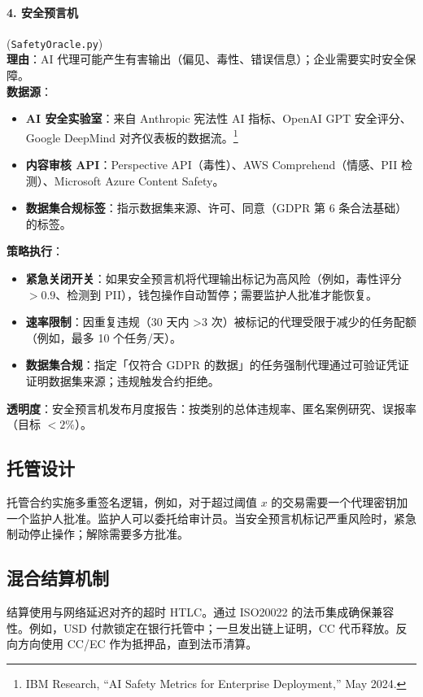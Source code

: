 \documentclass[11pt]{article}
\begin{document}
\paragraph{4. 安全预言机} (\texttt{SafetyOracle.py})\\
\textbf{理由}：AI 代理可能产生有害输出（偏见、毒性、错误信息）；企业需要实时安全保障。\\
\textbf{数据源}：
\begin{itemize}[noitemsep]
  \item \textbf{AI 安全实验室}：来自 Anthropic 宪法性 AI 指标、OpenAI GPT 安全评分、Google DeepMind 对齐仪表板的数据流。\footnote{IBM Research, ``AI Safety Metrics for Enterprise Deployment,'' May 2024.}
  \item \textbf{内容审核 API}：Perspective API（毒性）、AWS Comprehend（情感、PII 检测）、Microsoft Azure Content Safety。
  \item \textbf{数据集合规标签}：指示数据集来源、许可、同意（GDPR 第 6 条合法基础）的标签。
\end{itemize}
\textbf{策略执行}：
\begin{itemize}[noitemsep]
  \item \textbf{紧急关闭开关}：如果安全预言机将代理输出标记为高风险（例如，毒性评分 $>0.9$、检测到 PII），钱包操作自动暂停；需要监护人批准才能恢复。
  \item \textbf{速率限制}：因重复违规（30 天内 >3 次）被标记的代理受限于减少的任务配额（例如，最多 10 个任务/天）。
  \item \textbf{数据集合规}：指定「仅符合 GDPR 的数据」的任务强制代理通过可验证凭证证明数据集来源；违规触发合约拒绝。
\end{itemize}
\textbf{透明度}：安全预言机发布月度报告：按类别的总体违规率、匿名案例研究、误报率（目标 $<2\%$）。

\subsection{托管设计}
托管合约实施多重签名逻辑，例如，对于超过阈值 $x$ 的交易需要一个代理密钥加一个监护人批准。监护人可以委托给审计员。当安全预言机标记严重风险时，紧急制动停止操作；解除需要多方批准。

\subsection{混合结算机制}
结算使用与网络延迟对齐的超时 HTLC。通过 ISO20022 的法币集成确保兼容性。例如，USD 付款锁定在银行托管中；一旦发出链上证明，CC 代币释放。反向方向使用 CC/EC 作为抵押品，直到法币清算。
\end{document}

